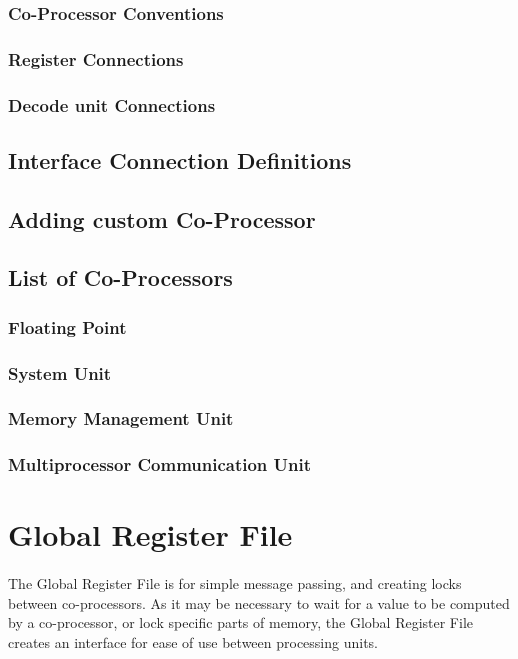 \documentclass[letterpaper, 11pt]{article}
\begin{document}
\subsubsection{Co-Processor Conventions}
\subsubsection{Register Connections}
\subsubsection{Decode unit Connections}
\subsection{Interface Connection Definitions}
\subsection{Adding custom Co-Processor}
\subsection{List of Co-Processors}
\subsubsection{Floating Point}
\subsubsection{System Unit}
\subsubsection{Memory Management Unit}
\subsubsection{Multiprocessor Communication Unit}

\section{Global Register File}
\paragraph{}The Global Register File is for simple message passing, and creating locks between co-processors.
As it may be necessary to wait for a value to be computed by a co-processor, or lock specific parts of memory,
the Global Register File creates an interface for ease of use between processing units.
\end{document}
